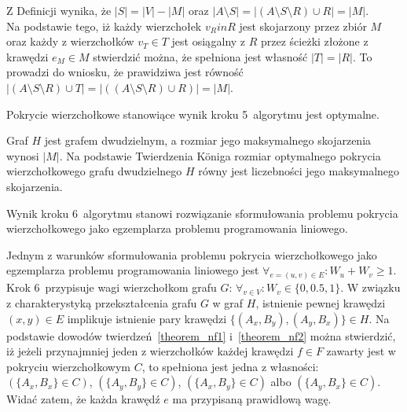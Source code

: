 \begin{bproof}
  Z Definicji wynika, że $|S| = |V| - |M|$ oraz $|A \setminus S|=|(A \setminus S
  \setminus R) \cup R|=|M|$.\\
  Na podstawie tego, iż każdy wierzchołek $v_R in R$ jest skojarzony przez zbiór $M$ oraz każdy z wierzchołków $v_T \in T$ jest osiągalny z $R$ przez ścieżki złożone z krawędzi $e_M \in M$ stwierdzić można, że spełniona jest własność $|T|=|R|$.
  To prowadzi do wniosku, że prawidziwa jest równość $|(A\setminus S\setminus R)\cup T|=|((A \setminus S \setminus R) \cup R)|=|M|$.
\end{bproof}
\begin{theorem}\label{theorem_nf2}
  Pokrycie wierzchołkowe stanowiące wynik kroku 5\ algorytmu jest optymalne.
\end{theorem}
\begin{bproof}
  Graf $H$ jest grafem dwudzielnym, a rozmiar jego maksymalnego skojarzenia wynosi $|M|$.
  Na podstawie Twierdzenia K\"oniga rozmiar optymalnego pokrycia wierzchołkowego grafu dwudzielnego $H$ równy jest liczebności jego maksymalnego skojarzenia.
\end{bproof}
\begin{theorem}
  Wynik kroku 6~algorytmu stanowi rozwiązanie sformułowania problemu pokrycia wierzchołkowego jako egzemplarza problemu programowania liniowego.
\end{theorem}
\begin{bproof}
  Jednym z warunków sformułowania problemu pokrycia wierzchołkowego jako egzemplarza problemu programowania liniowego jest $\forall_{e=(u,v) \in E}: W_u + W_v \geq 1$.
  Krok 6\ przypisuje wagi wierzchołkom grafu $G$: $\forall_{v \in V}: W_v \in \{0, 0.5, 1\}$.
  W związku z charakterystyką przekształcenia grafu $G$ w graf $H$, istnienie pewnej krawędzi $(x,y) \in E$ implikuje istnienie pary krawędzi $\{(A_x, B_y), (A_y, B_x)\} \in H$.
  Na podstawie dowodów twierdzeń~\ref{theorem_nf1} i~\ref{theorem_nf2} można stwierdzić, iż jeżeli przynajmniej jeden z wierzchołków każdej krawędzi $f \in F$ zawarty jest w pokryciu wierzchołkowym $C$, to spełniona jest jedna z własności: $(\{A_x, B_x\} \in C)$, $(\{A_y, B_y\} \in C)$, $(\{A_x, B_y\} \in C)$ albo $(\{A_y, B_x\} \in C)$.
  Widać zatem, że każda krawędź $e$ ma przypisaną prawidłową wagę.
\end{bproof}

